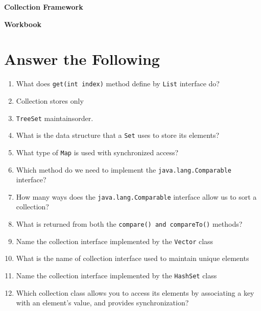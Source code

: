 \documentclass[11pt,a4paper]{article}
\begin{document}
\centerline{\huge{ \textbf{Collection Framework}}}

\vspace{1pc}

\centerline{\huge{ \textbf{Workbook}}}

\section*{Answer the Following}
\begin{enumerate}\itemsep10pt

\item What does \texttt{get(int index)} method define by \texttt{List} interface do?\underline{\hspace{4cm}}
\item Collection stores only\underline{\hspace{3cm}}
\item \texttt{TreeSet} maintains\underline{\hspace{3cm}}order.
\item What is the data structure that a \texttt{Set} uses to store its elements?\underline{\hspace{3cm}}
\item What type of \texttt{Map} is used with synchronized access?\underline{\hspace{3cm}}
\item Which method do we need to implement the \texttt{java.lang.Comparable} interface?\underline{\hspace{3cm}}
\item How many ways does the \texttt{java.lang.Comparable} interface allow us to sort a collection?\underline{\hspace{3cm}}
\item What is returned from both the \texttt{compare() and compareTo()} methods?\underline{\hspace{3cm}}
\item Name the collection interface implemented by the \texttt{Vector} class\underline{\hspace{3cm}}
\item What is the name of collection interface used to maintain unique elements\underline{\hspace{3cm}}
\item Name the collection interface implemented by the \texttt{HashSet} class\underline{\hspace{3cm}}
\item Which collection class allows you to access its elements by associating a key with an element's value, and provides synchronization?\underline{\hspace{3cm}}
\end{enumerate}
\end{document}
